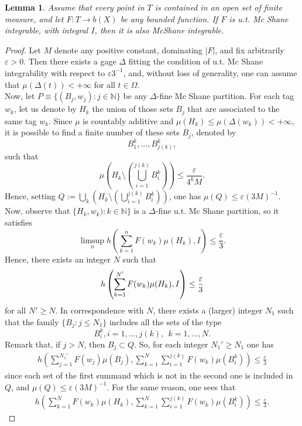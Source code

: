\documentclass[11pt,a4paper,twoside]{amsart}
\newtheorem{lemma}[theorem]{Lemma}
\begin{document}
\begin{lemma} \rm \label{nota2}
Assume that every point in $T$ is contained in an open set of finite measure, and let $F:T\to b(X)$ be any bounded function. If $F$ is u.t. Mc Shane integrable, with integral $I$, then it is also McShane integrable.
\end{lemma}
\begin{proof}
Let $M$ denote any positive constant, dominating $|F|$, and fix arbitrarily ${\varepsilon} >0$. Then there exists a gage $\Delta$ fitting the condition of u.t. Mc  Shane integrability with respect to ${\varepsilon} 3^{-1}$, and, without loss of generality, one can assume that $\mu(\Delta(t))<+\infty$ for all $t\in \Omega$.
\\
Now, let $P\equiv\{(B_j,w_j):j \in \mathbb{N}\}$ be any $\Delta$-fine Mc Shane partition.
For each tag $w_k$, let us denote by $H_k$ the union of those sets $B_j$ that are associated to the same tag $w_k$. Since $\mu$ is countably additive and $\mu(H_k)\leq \mu(\Delta(w_k))<+\infty$, it is possible to find a finite number of these sets $B_j$, denoted by
$$B_1^k,...,B_{j(k)}^k,$$
such that
$$\mu\left(H_k\setminus (\bigcup_{i=1}^{j(k)} B_i^k )\right)\leq \frac{\varepsilon}{4^kM}.$$
Hence, setting $Q:=\bigcup_k\left(H_k\setminus (\bigcup_{i=1}^{j(k)} B_i^k )\right)$, one has $\mu(Q)\leq {\varepsilon} (3M)^{-1}.$
Now, observe that $\{H_k,w_k):k\in \mathbb{N}\}$ is a $\Delta$-fine u.t. Mc Shane partition, so it satisfies
$$\limsup_nh\left(\sum_{k=1}^nF(w_k)\mu(H_k),I\right)\leq \frac{\varepsilon}{3}.$$
Hence, there exists an integer $N$ such that
\begin{eqnarray}{\label{uniq}}
h\left(\sum_{k=1}^{N'}F(w_k)\mu(H_k),I\right)\leq \frac{\varepsilon}{3}
\end{eqnarray}
for all $N'\geq N$.
In correspondence with $N$, there exists a (larger) integer $N_1$ such that the family $\{B_j:j\leq N_1\}$ includes all the sets of the type
$$B_i^k, i=1,...,j(k), \ \ k=1,...,N.$$
Remark that, if $j>N$, then $B_j\subset Q$.
So, for each integer $N_1'\geq N_1$ one has
\begin{eqnarray}\label{riduz}
h\left(\sum_{j=1}^{N_1'}F(w_j)\mu(B_j),\sum_{k=1}^N\sum_{i=1}^{j(k)}F(w_k)\mu(B_i^k)\right)
\leq \frac{\varepsilon}{3}
\end{eqnarray}
since each set of the first summand which is not in the second one is included in $Q$, and $\mu(Q)\leq {\varepsilon} (3M)^{-1}$.
For the same reason, one sees that
\begin{eqnarray}\label{confronto}
h\left(\sum_{k=1}^NF(w_k)\mu(H_k),\sum_{k=1}^N\sum_{i=1}^{j(k)}F(w_k)\mu(B_i^k)\right)\leq \frac{\varepsilon}{3}.

\end{eqnarray}
\end{proof}
\end{document}
